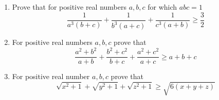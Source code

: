 \documentclass{article}
\begin{document}
\begin{enumerate}
	\item %
	Prove that for positive real numbers $a,b,c$ for which $abc=1$
	$$\frac{1}{a^3(b+c)}+\frac{1}{b^3(a+c)}+\frac{1}{c^3(a+b)} \geq \frac{3}{2}$$
	
	\item %
	For positive real numbers $a,b,c$ prove that
	$$\frac{a^2+b^2}{a+b} + \frac{b^2+c^2}{b+c} + \frac{a^2+c^2}{a+c} \geq a+b+c$$
	
	\item %
	For positive real number $a,b,c$ prove that
	$$ \sqrt{x^2+1} + \sqrt{y^2+1} + \sqrt{z^2+1} \geq \sqrt{6(x+y+z)}  $$
\end{enumerate}
\end{document}
